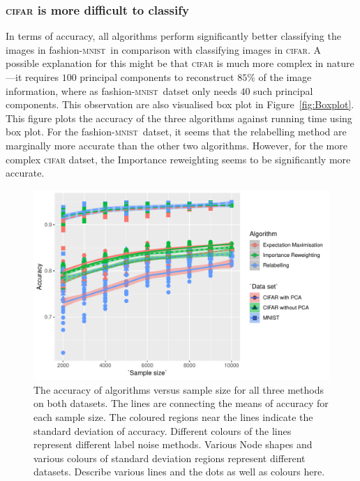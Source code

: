 \documentclass[12pt]{article} %
\newcommand{\mnist}{fashion-\textsc{mnist}}
\begin{document}
\subsubsection{\textsc{cifar} is more difficult to classify}
In terms of accuracy, all algorithms perform significantly better classifying the images in \mnist\ in comparison with classifying images in \textsc{cifar}.
A possible explanation for this might be that \textsc{cifar} is much more complex in nature---it requires $100$ principal components to reconstruct $85\%$ of the image information, where as \mnist\ datset only needs $40$ such principal components.
This observation are also visualised box plot in Figure~\ref{fig:Boxplot}. This figure plots the accuracy of the three algorithms against running time using box plot. For the \mnist\  datset, it seems that the relabelling method are marginally more accurate than the other two algorithms. However, for the  more complex \textsc{cifar} datset, the Importance reweighting seems to be significantly more accurate.
\begin{figure}
	\centering
    \includegraphics[scale=.8]{accuracy}%
	\caption{The accuracy of algorithms versus sample size for all three methods on both datasets. The lines are connecting the means of accuracy for each sample size. The coloured regions near the lines indicate the standard deviation of accuracy. Different colours of the lines represent different label noise methods. Various Node shapes and various colours of standard deviation regions represent different datasets. {\color{red}Describe various lines and the dots as well as colours here. }
}
	\label{fig:acc}
\end{figure}
\end{document}
